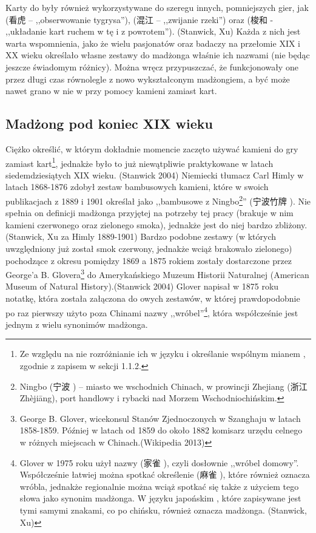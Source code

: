 Karty do  były również wykorzystywane do szeregu innych,
pomniejszych gier, jak  (看虎  -- ,,obserwowanie
tygrysa''),  (混江  -- ,,zwijanie rzeki'') oraz
 (梭和  - ,,układanie kart ruchem w tę i z
powrotem''). (Stanwick, Xu) Każda z nich jest warta wspomnienia, jako że wielu
pasjonatów oraz badaczy na przełomie XIX i XX wieku określało własne zestawy do
madżonga właśnie ich nazwami (nie będąc jeszcze świadomym różnicy).
Można wręcz przypuszczać, że funkcjonowały one przez długi czas równolegle z
nowo wykształconym madżongiem, a być może nawet grano w nie w przy pomocy
kamieni zamiast kart.
\subsection{Madżong pod koniec XIX wieku}
Ciężko określić, w którym dokładnie momencie zaczęto używać kamieni do gry
zamiast kart\footnote{Ze względu na nie rozróżnianie ich w języku i określanie
wspólnym mianem , zgodnie z zapisem w sekcji 1.1.2.}, jednakże było
to już niewątpliwie praktykowane w latach siedemdziesiątych XIX wieku. (Stanwick
2004) Niemiecki tłumacz Carl Himly w latach 1868-1876 zdobył zestaw bambusowych
kamieni, które w swoich publikacjach z 1889 i 1901 określał jako ,,bambusowe
 z Ningbo\footnote{Ningbo (宁波 ) -- miasto we
wschodnich Chinach, w prowincji Zhejiang (浙江 Zhèjiāng), port handlowy i rybacki
nad Morzem Wschodniochińskim.}'' (宁波竹牌 ). Nie spełnia on
definicji madżonga przyjętej na potrzeby tej pracy (brakuje w nim kamieni
czerwonego oraz zielonego smoka), jednakże jest do niej bardzo zbliżony.
(Stanwick, Xu za Himly 1889-1901) Bardzo podobne zestawy (w których uwzględniony
już został smok czerwony, jednakże wciąż brakowało zielonego) pochodzące z
okresu pomiędzy 1869 a 1875 rokiem zostały dostarczone przez George'a B.
Glovera\footnote{George B. Glover, wicekonsul Stanów Zjednoczonych w Szanghaju w
latach 1858-1859. Później w latach od 1859 do około 1882 komisarz urzędu celnego
w różnych miejscach w Chinach.(Wikipedia 2013)} do Amerykańskiego Muzeum
Historii Naturalnej (American Museum of Natural History).(Stanwick 2004) Glover
napisał w 1875 roku notatkę, która została załączona do owych zestawów, w której
prawdopodobnie po raz pierwszy użyto poza Chinami nazwy
,,wróbel''\footnote{Glover w 1975 roku użył nazwy  (家雀
), czyli dosłownie ,,wróbel domowy''. Współcześnie łatwiej można
spotkać określenie  (麻雀 ), które również oznacza
wróbla, jednakże regionalnie można wciąż spotkać się także z użyciem tego słowa
jako synonim madżonga. W języku japońskim , które zapisywane jest
tymi samymi znakami, co  po chińsku, również oznacza madżonga.
(Stanwick, Xu)}, która współcześnie jest jednym z wielu synonimów madżonga.
